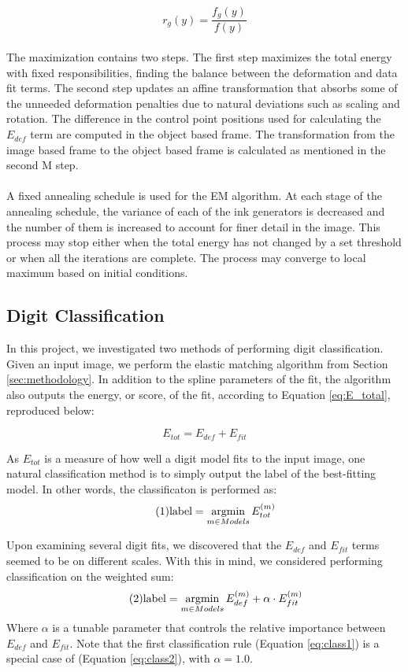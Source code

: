 \documentclass[oribibl]{llncs}
\newcommand\numberthis{\addtocounter{equation}{1}\tag{\theequation}} %
\newcommand{\argmin}{\operatornamewithlimits{argmin}}
\begin{document}
$$ r_g(y) = \frac{f_g(y)}{f(y)} $$
\\
The maximization contains two steps. The first step maximizes the total energy with fixed responsibilities, finding the balance between the deformation and data fit terms. The second step updates an affine transformation that absorbs some of the unneeded deformation penalties due to natural deviations such as scaling and rotation. The difference in the control point positions used for calculating the $E_{def}$ term are computed in the object based frame. The transformation from the image based frame to the object based frame is calculated as mentioned in the second M step.
\\
\\
A fixed annealing schedule is used for the EM algorithm. At each stage of the annealing schedule, the variance of each of the ink generators is decreased and the number of them is increased to account for finer detail in the image. This process may stop either when the total energy has not changed by a set threshold or when all the iterations are complete. The process may converge to local maximum based on initial conditions.

\subsection{Digit Classification}
\label{sec:classify}

In this project, we investigated two methods of performing digit classification.
Given an input image, we perform the elastic matching algorithm from Section \ref{sec:methodology}. 
In addition to the spline parameters of the fit, the algorithm also outputs the energy, or score, of the fit, according to Equation \ref{eq:E_total}, reproduced below:

\begin{equation*}
    E_{tot} = E_{def} + E_{fit}
\end{equation*}    

As $E_{tot}$ is a measure of how well a digit model fits to the input image, one natural classification method is to simply output the label of the best-fitting model.
In other words, the classificaton is performed as:
\begin{equation*}
\numberthis \label{eq:class1}
\text{label} = \argmin_{m \in Models}{E_{tot}^{(m)}}
\end{equation*}

Upon examining several digit fits, we discovered that the $E_{def}$ and $E_{fit}$ terms seemed to be on different scales.
With this in mind, we considered performing classification on the weighted sum:
\begin{equation*}
\numberthis \label{eq:class2}
\text{label} = \argmin_{m \in Models}{E_{def}^{(m)} + \alpha \cdot E_{fit}^{(m)}}
\end{equation*}
Where $\alpha$ is a tunable parameter that controls the relative importance between $E_{def}$ and $E_{fit}$.
Note that the first classification rule (Equation \ref{eq:class1}) is a special case of (Equation \ref{eq:class2}), with $\alpha = 1.0$.
\end{document}
